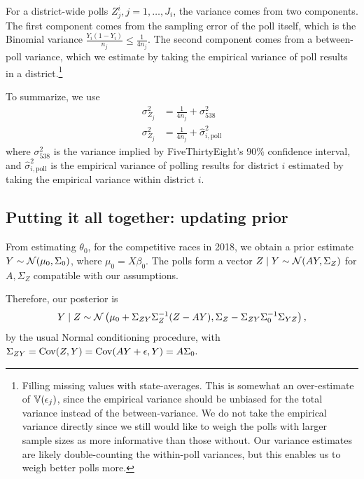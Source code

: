 \documentclass[12pt, letterpaper]{article}
\begin{document}
For a district-wide polls $Z_j^i, j = 1,\ldots,J_i$, the variance comes from two components. The first component comes from the sampling error of the poll itself, which is the Binomial variance $\frac{Y_i(1-Y_i)}{n_j} \le \frac{1}{4n_j}$. The second component comes from a between-poll variance, which we estimate by taking the empirical variance of poll results in a district.\footnote{Filling missing values with state-averages. This is somewhat an over-estimate of $\mathbb{V}(\epsilon_j)$, since the empirical variance should be unbiased for the total variance instead of the between-variance. We do not take the empirical variance directly since we still would like to weigh the polls with larger sample sizes as more informative than those without. Our variance estimates are likely double-counting the within-poll variances, but this enables us to weigh better polls more.} 

To summarize, we use \begin{align*}
\sigma^2_{Z_j} &= \frac{1}{4n_j} + \sigma^2_{538} \tag{Estimation for generic ballot poll variance}\\
\sigma^2_{Z_j} &= \frac{1}{4n_j} + \hat\sigma^2_{i,\text{poll}} \tag{Estimation for district poll variance}
\end{align*}
where $ \sigma^2_{538}$ is the variance implied by FiveThirtyEight's 90\% confidence interval, and $\hat\sigma^2_{i,\text{poll}}$ is the empirical variance of polling results for district $i$ estimated by taking the empirical variance within district $i$.

\subsection{Putting it all together: updating prior}
\label{sub:altogether}
From estimating $\theta_0$, for the competitive races in 2018, we obtain a prior estimate $Y \sim \mathcal{N}(\mu_0, \Sigma_0)$, where $\mu_0 = X\beta_0$. The polls form a vector $Z \mid Y \sim \mathcal{N}(AY, \Sigma_Z)$ for $A, \Sigma_Z$ compatible with our assumptions. 
    
Therefore, our posterior is 
\begin{equation}
  Y\mid Z \sim \mathcal{N}\left({
\mu_0 + \Sigma_{ZY} \Sigma_Z^{-1}(Z - AY), \Sigma_Z - \Sigma_{ZY} \Sigma_0^{-1} \Sigma_{YZ}
}\right),
\label{eq:normal_cond}
\end{equation}
by the usual Normal conditioning procedure, with $\Sigma_{ZY} = \operatorname{Cov}(Z, Y) = \operatorname{Cov}(AY + \epsilon, Y) = A\Sigma_0.$
\end{document}
